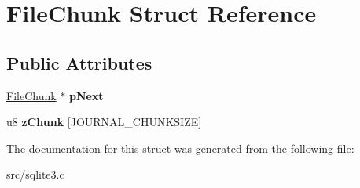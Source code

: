 \hypertarget{struct_file_chunk}{\section{File\-Chunk Struct Reference}
\label{struct_file_chunk}
}
\subsection*{Public Attributes}
\begin{DoxyCompactItemize}
\item 
\hypertarget{struct_file_chunk_ad2d0d170afc7ce1e239e8716852e247b}{\hyperlink{struct_file_chunk}{File\-Chunk} $\ast$ {\bfseries p\-Next}}\label{struct_file_chunk_ad2d0d170afc7ce1e239e8716852e247b}

\item 
\hypertarget{struct_file_chunk_ada06a9958ee6b82a6c2b15c29f847d19}{u8 {\bfseries z\-Chunk} \mbox{[}J\-O\-U\-R\-N\-A\-L\-\_\-\-C\-H\-U\-N\-K\-S\-I\-Z\-E\mbox{]}}\label{struct_file_chunk_ada06a9958ee6b82a6c2b15c29f847d19}

\end{DoxyCompactItemize}


The documentation for this struct was generated from the following file\-:\begin{DoxyCompactItemize}
\item 
src/sqlite3.\-c\end{DoxyCompactItemize}
